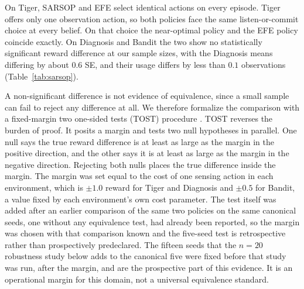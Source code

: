On Tiger, SARSOP and EFE select identical actions on every episode. Tiger offers only one observation action, so both policies face the same listen-or-commit choice at every belief. On that choice the near-optimal policy and the EFE policy coincide exactly. On Diagnosis and Bandit the two show no statistically significant reward difference at our sample sizes, with the Diagnosis means differing by about $0.6$ SE, and their usage differs by less than $0.1$ observations (Table~\ref{tab:sarsop}).

A non-significant difference is not evidence of equivalence, since a small sample can fail to reject any difference at all. We therefore formalize the comparison with a fixed-margin two one-sided tests (TOST) procedure \citep{schuirmann1987}. TOST reverses the burden of proof. It posits a margin and tests two null hypotheses in parallel. One null says the true reward difference is at least as large as the margin in the positive direction, and the other says it is at least as large as the margin in the negative direction. Rejecting both nulls places the true difference inside the margin. The margin was set equal to the cost of one sensing action in each environment, which is $\pm 1.0$ reward for Tiger and Diagnosis and $\pm 0.5$ for Bandit, a value fixed by each environment's own cost parameter. The test itself was added after an earlier comparison of the same two policies on the same canonical seeds, one without any equivalence test, had already been reported, so the margin was chosen with that comparison known and the five-seed test is retrospective rather than prospectively predeclared. The fifteen seeds that the $n{=}20$ robustness study below adds to the canonical five were fixed before that study was run, after the margin, and are the prospective part of this evidence. It is an operational margin for this domain, not a universal equivalence standard.

